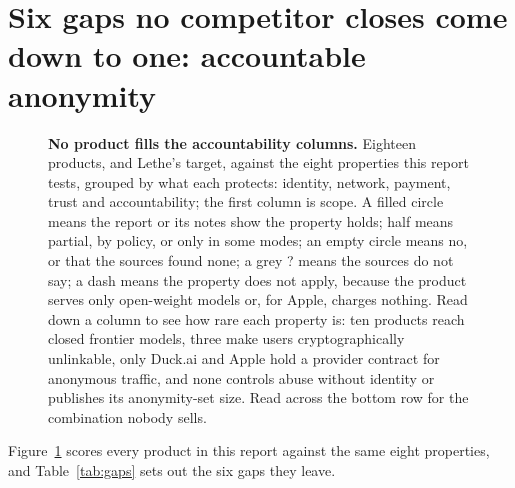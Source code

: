 \documentclass[10pt,a4paper]{article}
\begin{document}
\section{Six gaps no competitor closes come down to one: accountable anonymity}

\begin{figure}[tbp]
\centering
{}
\caption{\textbf{No product fills the accountability columns.} Eighteen products, and Lethe's target, against the eight properties this report tests, grouped by what each protects: identity, network, payment, trust and accountability; the first column is scope. A filled circle means the report or its notes show the property holds; half means partial, by policy, or only in some modes; an empty circle means no, or that the sources found none; a grey ? means the sources do not say; a dash means the property does not apply, because the product serves only open-weight models or, for Apple, charges nothing. Read down a column to see how rare each property is: ten products reach closed frontier models, three make users cryptographically unlinkable, only Duck.ai and Apple hold a provider contract for anonymous traffic, and none controls abuse without identity or publishes its anonymity-set size. Read across the bottom row for the combination nobody sells.}
\label{fig:capabilities}
\end{figure}

Figure~\ref{fig:capabilities} scores every product in this report against the same eight properties, and Table~\ref{tab:gaps} sets out the six gaps they leave.
\end{document}
